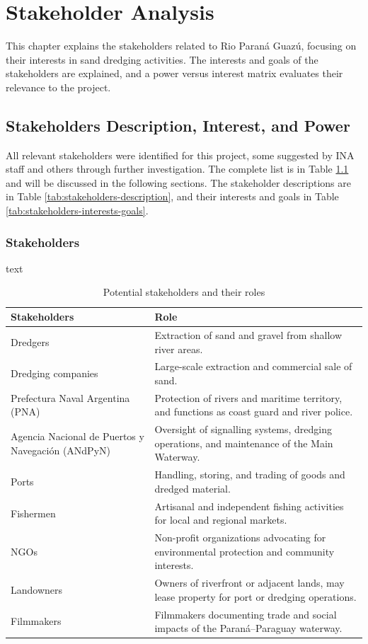 \chapter{Stakeholder Analysis}
\label{chapter:stakeholders}

This chapter explains the stakeholders related to Rio Paraná Guazú, focusing on their interests in sand dredging activities. The interests and goals of the stakeholders are explained, and a power versus interest matrix evaluates their relevance to the project.

\section{Stakeholders Description, Interest, and Power}

All relevant stakeholders were identified for this project, some suggested by INA staff and others through further investigation. The complete list is in Table \ref{tab:stakeholders} and will be discussed in the following sections. The stakeholder descriptions are in Table \ref{tab:stakeholders-description}, and their interests and goals in Table \ref{tab:stakeholders-interests-goals}.

\subsection{Stakeholders}
text

\begin{table}[H]
\centering
\begin{tabularx}{\linewidth}{p{3.5cm}X} %
\toprule
\textbf{Stakeholders} & \textbf{Role} \\
\midrule
Dredgers & Extraction of sand and gravel from shallow river areas. \\
\midrule
Dredging companies & Large-scale extraction and commercial sale of sand. \\
\midrule
Prefectura Naval Argentina (PNA) & Protection of rivers and maritime territory, and functions as coast guard and river police. \\
\midrule
Agencia Nacional de Puertos y Navegación (ANdPyN) & Oversight of signalling systems, dredging operations, and maintenance of the Main Waterway. \\
\midrule
Ports & Handling, storing, and trading of goods and dredged material. \\
\midrule
Fishermen & Artisanal and independent fishing activities for local and regional markets. \\
\midrule
NGOs & Non-profit organizations advocating for environmental protection and community interests. \\
\midrule
Landowners & Owners of riverfront or adjacent lands, may lease property for port or dredging operations. \\
\midrule
Filmmakers & Filmmakers documenting trade and social impacts of the Paraná–Paraguay waterway. \\
\bottomrule
\end{tabularx}
\caption{Potential stakeholders and their roles}
\label{tab:stakeholders}
\end{table}

